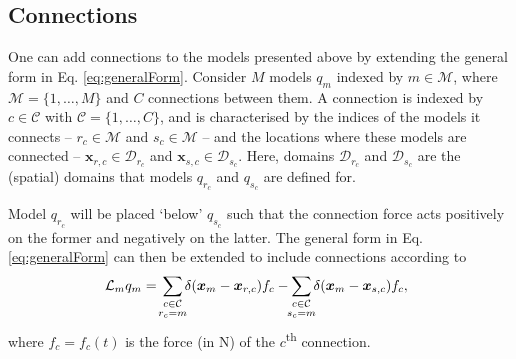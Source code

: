 \documentclass{article}
\begin{document}
\subsection{Connections}\label{sec:contConnections}


One can add connections to the models presented above by extending the general form in Eq. \eqref{eq:generalForm}. Consider $M$ models $q_m$ indexed by $m \in \mathcal{M}$, where $\mathcal{M} = \{1, \hdots, M\}$ and $C$ connections between them. A connection is indexed by $c\in \mathcal{C}$ with $\mathcal{C} = \{1, \hdots, C\}$, and is characterised by the indices of the models it connects -- $r_c \in \mathcal{M}$ and $s_c\in \mathcal{M}$ -- and the locations where these models are connected -- $\boldsymbol{x}_{r, c}\in \mathcal{D}_{r_c}$ and $\boldsymbol{x}_{s, c}\in \mathcal{D}_{s_c}$. Here, domains $\mathcal{D}_{r_c}$ and $\mathcal{D}_{s_c}$ are the (spatial) domains that models $q_{r_c}$ and $q_{s_c}$ are defined for.  

Model $q_{r_c}$ will be placed `below' $q_{s_c}$ such that the connection force acts positively on the former and negatively on the latter. The general form in Eq. \eqref{eq:generalForm} can then be extended to include connections according to
\begin{equation}\label{eq:generalFormConnections}
    \!\!\!\mathcal{L}_mq_m =\!\sum_{\substack{c\in \mathcal{C}\vspace{0.1em}\\ r_c = m}}\!\! \delta(\boldsymbol{x}_m - \boldsymbol{x}_{r, c}) f_c-\!\! \sum_{\substack{c\in \mathcal{C}\vspace{0.1em}\\ s_c = m}}\!\! \delta(\boldsymbol{x}_m - \boldsymbol{x}_{s,c}) f_c,
\end{equation}
where $f_c = f_c(t)$ is the force (in N) of the $c$\textsuperscript{th} connection.
\end{document}
